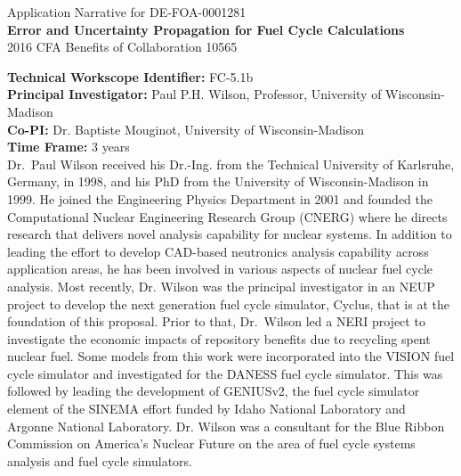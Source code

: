 \documentclass[dvips,12pt]{article}
\begin{document}
\begin{centering}
  Application Narrative for DE-FOA-0001281\\
  \textbf{\large Error and Uncertainty Propagation for Fuel Cycle Calculations}\\
  2016 CFA Benefits of Collaboration 10565\\
\end{centering}
\vspace{1em}

\noindent\textbf{Technical Workscope Identifier:} FC-5.1b\\
\textbf{Principal Investigator:} Paul P.H. Wilson, Professor, University of Wisconsin-Madison\\
\textbf{Co-PI:} Dr. Baptiste Mouginot, University of Wisconsin-Madison\\
\textbf{Time Frame:} 3 years\\

Dr.\ Paul Wilson received his Dr.-Ing. from the Technical University of
Karlsruhe, Germany, in 1998, and his PhD from the University of
Wisconsin-Madison in 1999. He joined the Engineering Physics
Department in 2001 and founded the Computational Nuclear Engineering
Research Group (CNERG) where he directs research that delivers novel
analysis capability for nuclear systems. In addition to leading the
effort to develop CAD-based neutronics analysis capability across
application areas, he has been involved in various aspects of nuclear
fuel cycle analysis. Most recently, Dr. Wilson was the principal
investigator in an NEUP project to develop the next generation fuel
cycle simulator, Cyclus, that is at the foundation of this proposal.
Prior to that, Dr.\ Wilson led a NERI project to investigate the
economic impacts of repository benefits due to recycling spent nuclear
fuel.  Some models from this work were incorporated into the VISION
fuel cycle simulator and investigated for the DANESS fuel cycle
simulator.  This was followed by leading the development of GENIUSv2,
the fuel cycle simulator element of the SINEMA effort funded by Idaho
National Laboratory and Argonne National Laboratory.  Dr. Wilson was a
consultant for the Blue Ribbon Commission on America’s Nuclear Future
on the area of fuel cycle systems analysis and fuel cycle simulators.
\end{document}
